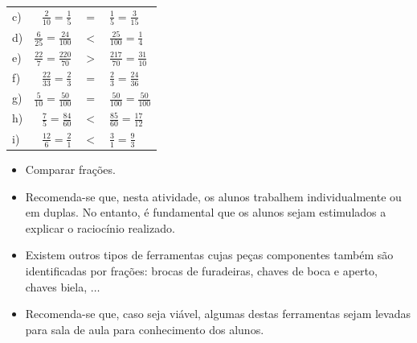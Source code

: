 \begin{multicols}{2}
\begin{solucao}{}{}
\begin{tabular}{lrcl}
       c) &  $\frac{2}{10} = \frac{1}{5}$ &   $=$  &  $\frac{1}{5} =
\frac{3}{15}$ \\

       d) &  $\frac{6}{25} = \frac{24}{100}$ &   $<$  &  $\frac{25}{100} =
\frac{1}{4}$ \\

       e) &  $\frac{22}{7} = \frac{220}{70}$ &   $>$  &  $\frac{217}{70} =
\frac{31}{10}$ \\

       f) &  $\frac{22}{33} = \frac{2}{3}$ &   $=$  &  $\frac{2}{3} =
\frac{24}{36}$ \\

       g) &  $\frac{5}{10} = \frac{50}{100}$ &   $=$  &  $\frac{50}{100} =
\frac{50}{100}$ \\

       h) &  $\frac{7}{5} = \frac{84}{60}$ &   $<$  &  $\frac{85}{60} =
\frac{17}{12}$ \\

       i) &  $\frac{12}{6} = \frac{2}{1}$ &   $<$  &  $\frac{3}{1} =
\frac{9}{3}$ \\

    \end{tabular}
\end{solucao}



\begin{objetivos}[label=chap4-ativ14]{}{}
\begin{itemize} %
    \item       Comparar frações.
\end{itemize} %
\end{objetivos}

\begin{orientacoes}{}{}

\begin{itemize} %
    \item       Recomenda-se que, nesta atividade, os alunos trabalhem
individualmente ou em duplas. No entanto, é fundamental que os alunos sejam
estimulados a explicar o raciocínio realizado.
    \item       Existem outros tipos de ferramentas cujas peças componentes
também são identificadas por frações: brocas de furadeiras, chaves de boca e
aperto, chaves biela,       $\ldots$
    \item       Recomenda-se que, caso seja viável, algumas destas ferramentas
sejam levadas para sala de aula para conhecimento dos alunos.
\end{itemize} %



\end{orientacoes}
\end{multicols}
